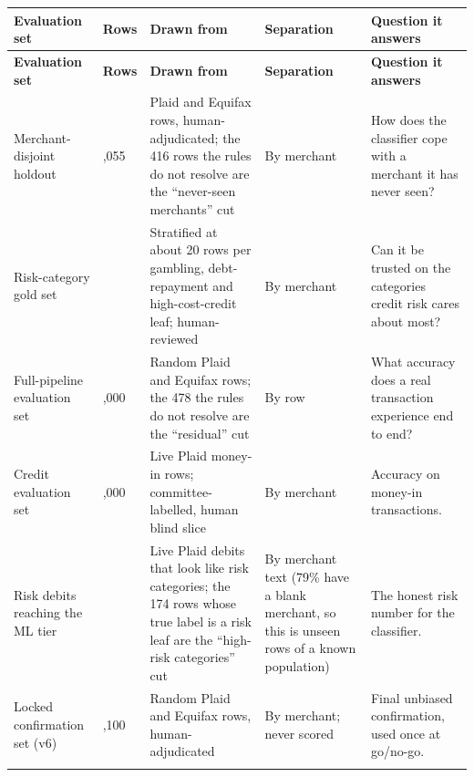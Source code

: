 {\small
\setlength{\TableWidth}{\dimexpr\linewidth-10\tabcolsep\relax}
\begin{longtable}{>{\raggedright\arraybackslash}p{0.19\TableWidth}>{\raggedright\arraybackslash}p{0.07\TableWidth}>{\raggedright\arraybackslash}p{0.31\TableWidth}>{\raggedright\arraybackslash}p{0.15\TableWidth}>{\raggedright\arraybackslash}p{0.28\TableWidth}}
\rowcolor{BlueTint}
\bfseries Evaluation set & \bfseries Rows & \bfseries Drawn from & \bfseries Separation & \bfseries Question it answers \\ \midrule
\endfirsthead
\rowcolor{BlueTint}
\bfseries Evaluation set & \bfseries Rows & \bfseries Drawn from & \bfseries Separation & \bfseries Question it answers \\ \midrule
\endhead
Merchant-disjoint holdout & 1,055 & Plaid and Equifax rows, human-adjudicated; the 416 rows the rules do not resolve are the ``never-seen merchants'' cut & By merchant & How does the classifier cope with a merchant it has never seen? \\ \addlinespace[4pt]
Risk-category gold set & 711 & Stratified at about 20 rows per gambling, debt-repayment and high-cost-credit leaf; human-reviewed & By merchant & Can it be trusted on the categories credit risk cares about most? \\ \addlinespace[4pt]
Full-pipeline evaluation set & 2,000 & Random Plaid and Equifax rows; the 478 the rules do not resolve are the ``residual'' cut & By row & What accuracy does a real transaction experience end to end? \\ \addlinespace[4pt]
Credit evaluation set & 2,000 & Live Plaid money-in rows; committee-labelled, human blind slice & By merchant & Accuracy on money-in transactions. \\ \addlinespace[4pt]
Risk debits reaching the ML tier & 400 & Live Plaid debits that look like risk categories; the 174 rows whose true label is a risk leaf are the ``high-risk categories'' cut & By merchant text (79\% have a blank merchant, so this is unseen rows of a known population) & The honest risk number for the classifier. \\ \addlinespace[4pt]
Locked confirmation set (v6) & 1,100 & Random Plaid and Equifax rows, human-adjudicated & By merchant; never scored & Final unbiased confirmation, used once at go/no-go. \\ \addlinespace[4pt]
\bottomrule
\end{longtable}}
